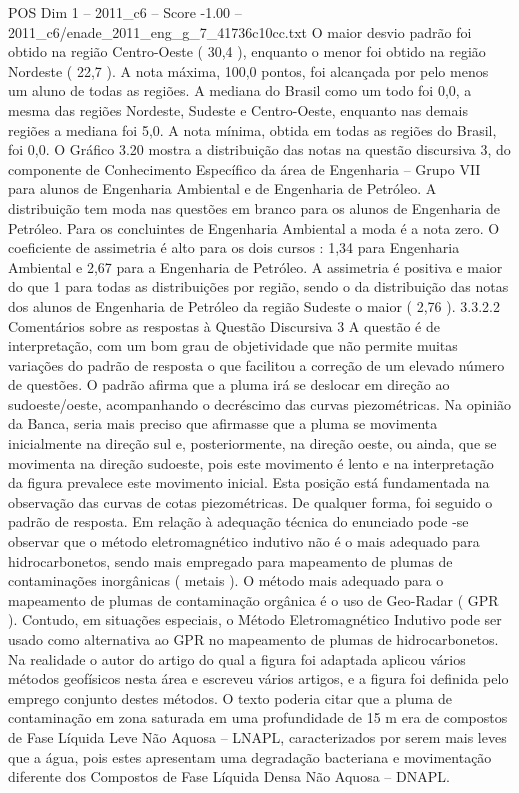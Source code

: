\begin{textsample}{POS Dim 1 – 2011\_c6 – Score -1.00 – 2011\_c6/enade\_2011\_eng\_g\_7\_41736c10cc.txt}
O maior desvio padrão foi obtido na região Centro-Oeste ( 30,4 ), enquanto o menor foi obtido na região Nordeste ( 22,7 ).
A nota máxima, 100,0 pontos, foi alcançada por pelo menos um aluno de todas as regiões.
A mediana do Brasil como um todo foi 0,0, a mesma das regiões Nordeste, Sudeste e Centro-Oeste, enquanto nas demais regiões a mediana foi 5,0.
A nota mínima, obtida em todas as regiões do Brasil, foi 0,0.
O Gráfico 3.20 mostra a distribuição das notas na questão discursiva 3, do componente de Conhecimento Específico da área de Engenharia – Grupo VII para alunos de Engenharia Ambiental e de Engenharia de Petróleo.
A distribuição tem moda nas questões em branco para os alunos de Engenharia de Petróleo.
Para os concluintes de Engenharia Ambiental a moda é a nota zero.
O coeficiente de assimetria é alto para os dois cursos : 1,34 para Engenharia Ambiental e 2,67 para a Engenharia de Petróleo.
A assimetria é positiva e maior do que 1 para todas as distribuições por região, sendo o da distribuição das notas dos alunos de Engenharia de Petróleo da região Sudeste o maior ( 2,76 ). 3.3.2.2 Comentários sobre as respostas à Questão Discursiva 3 A questão é de interpretação, com um bom grau de objetividade que não permite muitas variações do padrão de resposta o que facilitou a correção de um elevado número de questões.
O padrão afirma que a pluma irá se deslocar em direção ao sudoeste/oeste, acompanhando o decréscimo das curvas piezométricas.
Na opinião da Banca, seria mais preciso que afirmasse que a pluma se movimenta inicialmente na direção sul e, posteriormente, na direção oeste, ou ainda, que se movimenta na direção sudoeste, pois este movimento é lento e na interpretação da figura prevalece este movimento inicial.
Esta posição está fundamentada na observação das curvas de cotas piezométricas.
De qualquer forma, foi seguido o padrão de resposta.
Em relação à adequação técnica do enunciado pode -se observar que o método eletromagnético indutivo não é o mais adequado para hidrocarbonetos, sendo mais empregado para mapeamento de plumas de contaminações inorgânicas ( metais ).
O método mais adequado para o mapeamento de plumas de contaminação orgânica é o uso de Geo-Radar ( GPR ).
Contudo, em situações especiais, o Método Eletromagnético Indutivo pode ser usado como alternativa ao GPR no mapeamento de plumas de hidrocarbonetos.
Na realidade o autor do artigo do qual a figura foi adaptada aplicou vários métodos geofísicos nesta área e escreveu vários artigos, e a figura foi definida pelo emprego conjunto destes métodos.
O texto poderia citar que a pluma de contaminação em zona saturada em uma profundidade de 15 m era de compostos de Fase Líquida Leve Não Aquosa – LNAPL, caracterizados por serem mais leves que a água, pois estes apresentam uma degradação bacteriana e movimentação diferente dos Compostos de Fase Líquida Densa Não Aquosa – DNAPL.

\end{textsample}
